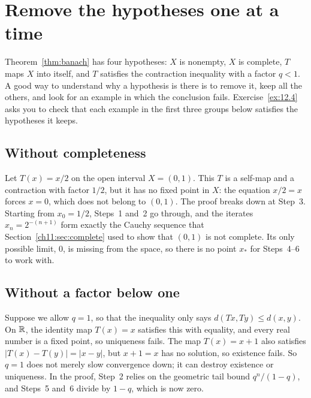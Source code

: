 \section{Remove the hypotheses one at a time}\label{ch12:sec:hypotheses}
Theorem~\ref{thm:banach} has four hypotheses: $X$ is nonempty, $X$ is complete, $T$ maps $X$ into itself, and $T$ satisfies the contraction inequality with a factor $q<1$. A good way to understand why a hypothesis is there is to remove it, keep all the others, and look for an example in which the conclusion fails. Exercise~\ref{ex:12.4} asks you to check that each example in the first three groups below satisfies the hypotheses it keeps.

\subsection*{Without completeness}
Let $T(x)=x/2$ on the open interval $X=(0,1)$. This $T$ is a self-map and a contraction with factor $1/2$, but it has no fixed point in $X$: the equation $x/2=x$ forces $x=0$, which does not belong to $(0,1)$. The proof breaks down at Step~3. Starting from $x_0=1/2$, Steps~1 and~2 go through, and the iterates $x_n=2^{-(n+1)}$ form exactly the Cauchy sequence that Section~\ref{ch11:sec:complete} used to show that $(0,1)$ is not complete. Its only possible limit, $0$, is missing from the space, so there is no point $x_*$ for Steps~4--6 to work with.

\subsection*{Without a factor below one}
Suppose we allow $q=1$, so that the inequality only says $d(Tx,Ty)\le d(x,y)$. On $\mathbb R$, the identity map $T(x)=x$ satisfies this with equality, and every real number is a fixed point, so uniqueness fails. The map $T(x)=x+1$ also satisfies $|T(x)-T(y)|=|x-y|$, but $x+1=x$ has no solution, so existence fails. So $q=1$ does not merely slow convergence down; it can destroy existence or uniqueness. In the proof, Step~2 relies on the geometric tail bound $q^n/(1-q)$, and Steps~5 and~6 divide by $1-q$, which is now zero.

